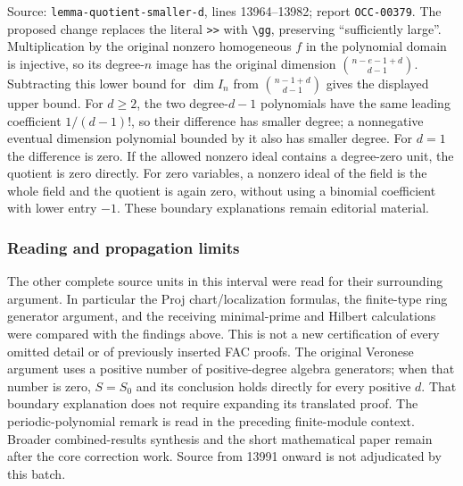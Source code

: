 Source: \texttt{lemma-\AlgebraIdentifierBreak{}quotient-\AlgebraIdentifierBreak{}smaller-\AlgebraIdentifierBreak{}d}, lines 13964--13982; report \texttt{OCC-00379}. The proposed change replaces the literal \texttt{\textgreater{}\textgreater{}} with \texttt{\textbackslash{}gg}, preserving ``sufficiently large''. Multiplication by the original nonzero homogeneous \(f\) in the polynomial domain is injective, so its degree-\(n\) image has the original dimension \(\binom{n-e-1+d}{d-1}\). Subtracting this lower bound for \(\dim I_n\) from \(\binom{n-1+d}{d-1}\) gives the displayed upper bound. For \(d\geq2\), the two degree-\(d-1\) polynomials have the same leading coefficient \(1/(d-1)!\), so their difference has smaller degree; a nonnegative eventual dimension polynomial bounded by it also has smaller degree. For \(d=1\) the difference is zero. If the allowed nonzero ideal contains a degree-zero unit, the quotient is zero directly. For zero variables, a nonzero ideal of the field is the whole field and the quotient is again zero, without using a binomial coefficient with lower entry \(-1\). These boundary explanations remain editorial material.

\subsubsection{Reading and propagation limits}\label{algebra-proof-002-reading-and-propagation-limits}

The other complete source units in this interval were read for their surrounding argument. In particular the Proj chart/localization formulas, the finite-type ring generator argument, and the receiving minimal-prime and Hilbert calculations were compared with the findings above. This is not a new certification of every omitted detail or of previously inserted FAC proofs. The original Veronese argument uses a positive number of positive-degree algebra generators; when that number is zero, \(S=S_0\) and its conclusion holds directly for every positive \(d\). That boundary explanation does not require expanding its translated proof. The periodic-polynomial remark is read in the preceding finite-module context. Broader combined-results synthesis and the short mathematical paper remain after the core correction work. Source from 13991 onward is not adjudicated by this batch.
